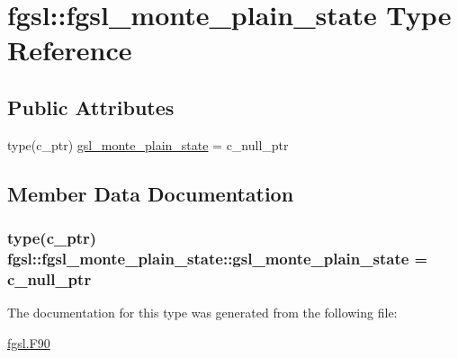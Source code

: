 \hypertarget{structfgsl_1_1fgsl__monte__plain__state}{\section{fgsl\-:\-:fgsl\-\_\-monte\-\_\-plain\-\_\-state Type Reference}
\label{structfgsl_1_1fgsl__monte__plain__state}
}
\subsection*{Public Attributes}
\begin{DoxyCompactItemize}
\item 
type(c\-\_\-ptr) \hyperlink{structfgsl_1_1fgsl__monte__plain__state_a1917f5fa5cb7b26af000d85f01ae44cb}{gsl\-\_\-monte\-\_\-plain\-\_\-state} = c\-\_\-null\-\_\-ptr
\end{DoxyCompactItemize}


\subsection{Member Data Documentation}
\hypertarget{structfgsl_1_1fgsl__monte__plain__state_a1917f5fa5cb7b26af000d85f01ae44cb}{
\subsubsection[{gsl\-\_\-monte\-\_\-plain\-\_\-state}]{\setlength{\rightskip}{0pt plus 5cm}type(c\-\_\-ptr) fgsl\-::fgsl\-\_\-monte\-\_\-plain\-\_\-state\-::gsl\-\_\-monte\-\_\-plain\-\_\-state = c\-\_\-null\-\_\-ptr}}\label{structfgsl_1_1fgsl__monte__plain__state_a1917f5fa5cb7b26af000d85f01ae44cb}


The documentation for this type was generated from the following file\-:\begin{DoxyCompactItemize}
\item 
\hyperlink{fgsl_8F90}{fgsl.\-F90}\end{DoxyCompactItemize}
